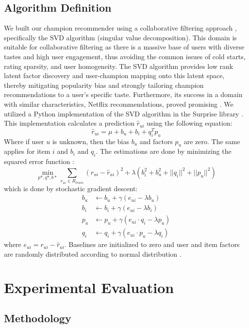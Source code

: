 \documentclass [11pt]{IEEEtran}
\begin{document}
\subsection{Algorithm Definition}
We built our champion recommender using a collaborative filtering approach \cite{Sarwar:2001}, specifically the SVD algorithm (singular value decomposition). 
This domain is suitable for collaborative filtering as there is a massive base of users with diverse tastes and high user engagement, thus avoiding the common issues of cold starts, rating sparsity, and user homogeneity.
The SVD algorithm provides low rank latent factor discovery and user-champion mapping onto this latent space, thereby mitigating popularity bias and strongly tailoring champion recommendations to a user's specific taste.
Furthermore, its success in a domain with similar characteristics, Netflix recommendations, proved promising \cite{paterek2007improving}.
We utilized a Python implementation of the SVD algorithm in the Surprise library \cite{Surprise}. \medskip
This implementation calculates a prediction $\hat{r}_{ui}$ using the following equation:
$$
    \hat{r}_{ui} = \mu + b_u + b_i + q_i^Tp_u
$$
Where if user $u$ is unknown, then the bias $b_u$ and factors $p_u$ are zero. The same applies for item $i$ and $b_i$ and $q_i$. The estimations are done by minimizing the squared error function
\cite{koren2009matrix}:
$$
    \min_{p*,q*,b*} \sum_{r_{ui} \in R_{train}} \left(r_{ui} - \hat{r}_{ui} \right)^2 + 
\lambda\left(b_i^2 + b_u^2 + ||q_i||^2 + ||p_u||^2\right)
$$
which is done by stochastic gradient descent:
\begin{align*}
b_u &\leftarrow b_u + \gamma (e_{ui} - \lambda b_u)\\
b_i &\leftarrow b_i + \gamma (e_{ui} - \lambda b_i)\\
p_u &\leftarrow p_u + \gamma (e_{ui} \cdot q_i - \lambda p_u)\\
q_i &\leftarrow q_i + \gamma (e_{ui} \cdot p_u - \lambda q_i)
\end{align*}
where $e_{ui} = r_{ui} - \hat{r}_{ui}$. Baselines are initialized to zero and user and item factors are randomly distributed according to normal distribution \cite{Surprise}.
\section{Experimental Evaluation}
\subsection{Methodology}
\end{document}
